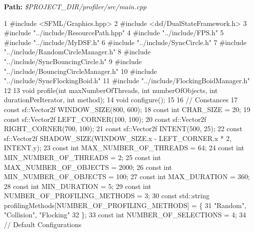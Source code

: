 {\bfseries Path\+:} {\itshape \$\+P\+R\+O\+J\+E\+C\+T\+\_\+\+D\+I\+R/profiler/src/main.cpp} 
\begin{DoxyCodeInclude}
1 \textcolor{preprocessor}{#include <SFML/Graphics.hpp>}
2 \textcolor{preprocessor}{#include <dsf/DualStateFramework.h>}
3 \textcolor{preprocessor}{#include "../include/ResourcePath.hpp"}
4 \textcolor{preprocessor}{#include "../include/FPS.h"}
5 \textcolor{preprocessor}{#include "../include/MyDSF.h"}
6 \textcolor{preprocessor}{#include "../include/SyncCircle.h"}
7 \textcolor{preprocessor}{#include "../include/RandomCircleManager.h"}
8 \textcolor{preprocessor}{#include "../include/SyncBouncingCircle.h"}
9 \textcolor{preprocessor}{#include "../include/BouncingCircleManager.h"}
10 \textcolor{preprocessor}{#include "../include/SyncFlockingBoid.h"}
11 \textcolor{preprocessor}{#include "../include/FlockingBoidManager.h"}
12 
13 \textcolor{keywordtype}{void} profile(\textcolor{keywordtype}{int} maxNumberOfThreads, \textcolor{keywordtype}{int} numberOfObjects, \textcolor{keywordtype}{int} durationPerIterator, \textcolor{keywordtype}{int} method);
14 \textcolor{keywordtype}{void} configure();
15 
16 \textcolor{comment}{// Constances}
17 \textcolor{keyword}{const} sf::Vector2f WINDOW\_SIZE(800, 600);
18 \textcolor{keyword}{const} \textcolor{keywordtype}{int} CHAR\_SIZE = 20;
19 \textcolor{keyword}{const} sf::Vector2f LEFT\_CORNER(100, 100);
20 \textcolor{keyword}{const} sf::Vector2f RIGHT\_CORNER(700, 100);
21 \textcolor{keyword}{const} sf::Vector2f INTENT(500, 25);
22 \textcolor{keyword}{const} sf::Vector2f SHADOW\_SIZE(WINDOW\_SIZE.x - LEFT\_CORNER.x * 2, INTENT.y);
23 \textcolor{keyword}{const} \textcolor{keywordtype}{int} MAX\_NUMBER\_OF\_THREADS = 64;
24 \textcolor{keyword}{const} \textcolor{keywordtype}{int} MIN\_NUMBER\_OF\_THREADS = 2;
25 \textcolor{keyword}{const} \textcolor{keywordtype}{int} MAX\_NUMBER\_OF\_OBJECTS = 2000;
26 \textcolor{keyword}{const} \textcolor{keywordtype}{int} MIN\_NUMBER\_OF\_OBJECTS = 100;
27 \textcolor{keyword}{const} \textcolor{keywordtype}{int} MAX\_DURATION = 360;
28 \textcolor{keyword}{const} \textcolor{keywordtype}{int} MIN\_DURATION = 5;
29 \textcolor{keyword}{const} \textcolor{keywordtype}{int} NUMBER\_OF\_PROFILING\_METHODS = 3;
30 \textcolor{keyword}{const} std::string profilingMethods[NUMBER\_OF\_PROFILING\_METHODS] = \{
31     \textcolor{stringliteral}{"Random"}, \textcolor{stringliteral}{"Collision"}, \textcolor{stringliteral}{"Flocking"}
32 \};
33 \textcolor{keyword}{const} \textcolor{keywordtype}{int} NUMBER\_OF\_SELECTIONS = 4;
34 \textcolor{comment}{// Default Configurations}

\end{DoxyCodeInclude}
